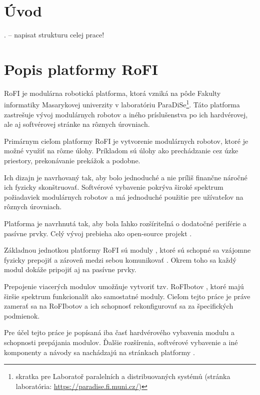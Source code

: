 \documentclass[
  digital, %
  oneside, %
  notable,   %
  lof,     %
  nolot,     %
]{fithesis3}
\begin{document}
\chapter*{Úvod}
\cite{modularAdvantage}. 
-- napisat strukturu celej prace!

\chapter{Popis platformy RoFI}
\label{sec:platform}
RoFI je modulárna robotická platforma, ktorá vzniká na pôde Fakulty informatiky Masarykovej univerzity v laboratóriu ParaDiSe\footnote{skratka pre Laboratoř paralelních a distribuovaných systémů (stránka laboratória: \url{https://paradise.fi.muni.cz/})}. Táto platforma zastrešuje vývoj modulárnych robotov a iného príslušenstva po ich hardvérovej, ale aj softvérovej stránke na rôznych úrovniach. 

Primárnym cieľom platformy RoFI je vytvorenie modulárnych robotov, ktoré je možné využiť na rôzne úlohy. Príkladom sú úlohy ako prechádzanie cez úzke priestory, prekonávanie prekážok a podobne. 

Ich dizajn je navrhovaný tak, aby bolo jednoduché a nie príliš finančne náročné ich fyzicky skonštruovať. Softvérové vybavenie pokrýva široké spektrum požiadaviek modulárnych robotov a má jednoduché použitie pre užívateľov na rôznych úrovniach. 

Platforma je navrhnutá tak, aby bola ľahko rozšíriteľná o dodatočné periférie a pasívne prvky. Celý vývoj prebieha ako open-source projekt \cite{rofiGit}. 

Základnou jednotkou platformy RoFI sú moduly \cite{mrazekMasterThesis}, ktoré sú schopné sa vzájomne fyzicky prepojiť a zároveň medzi sebou komunikovať \cite{rofiCom}. Okrem toho sa každý modul dokáže pripojiť aj na pasívne prvky. 

Prepojenie viacerých modulov umožňuje vytvoriť tzv. RoFIbotov \cite{rofiWeb}, ktoré majú širšie spektrum funkcionalít ako samostatné moduly. Cieľom tejto práce je práve zamerať sa na RoFIbotov a ich schopnosť rekonfigurovať sa za špecifických podmienok. 

Pre účel tejto práce je popísaná iba časť hardvérového vybavenia modulu a schopnosti prepájania modulov. Ďalšie rozšírenia, softvérové vybavenie a iné komponenty a návody sa nachádzajú na stránkach platformy \cite{rofiWeb}.
\end{document}
